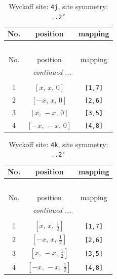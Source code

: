\documentclass[fleqn,8pt]{jsarticle}
\begin{document}
\begin{longtable}{ccc}
\caption{Wyckoff site: {\tt 4j}, site symmetry: {\tt ..2'}}
 \\
 \hline \hline
No. & position & mapping \\ \hline \endfirsthead

\multicolumn{2}{l}{\tablename\ \thetable{}} \\
 \hline \hline
No. & position & mapping \\ \hline \endhead

 \hline \hline
\multicolumn{2}{r}{\footnotesize\it continued ...} \\ \endfoot

 \hline \hline
\multicolumn{2}{r}{} \\ \endlastfoot

1 & $\left[ x,\, x,\, 0 \right]$ & {\tt [1,7]} \\ \hline
2 & $\left[ - x,\, x,\, 0 \right]$ & {\tt [2,6]} \\ \hline
3 & $\left[ x,\, - x,\, 0 \right]$ & {\tt [3,5]} \\ \hline
4 & $\left[ - x,\, - x,\, 0 \right]$ & {\tt [4,8]} \\
\end{longtable}
\renewcommand{\arraystretch}{1.2}
\begin{longtable}{ccc}
\caption{Wyckoff site: {\tt 4k}, site symmetry: {\tt ..2'}}
 \\
 \hline \hline
No. & position & mapping \\ \hline \endfirsthead

\multicolumn{2}{l}{\tablename\ \thetable{}} \\
 \hline \hline
No. & position & mapping \\ \hline \endhead

 \hline \hline
\multicolumn{2}{r}{\footnotesize\it continued ...} \\ \endfoot

 \hline \hline
\multicolumn{2}{r}{} \\ \endlastfoot

1 & $\left[ x,\, x,\, \frac{1}{2} \right]$ & {\tt [1,7]} \\ \hline
2 & $\left[ - x,\, x,\, \frac{1}{2} \right]$ & {\tt [2,6]} \\ \hline
3 & $\left[ x,\, - x,\, \frac{1}{2} \right]$ & {\tt [3,5]} \\ \hline
4 & $\left[ - x,\, - x,\, \frac{1}{2} \right]$ & {\tt [4,8]} \\
\end{longtable}
\end{document}
